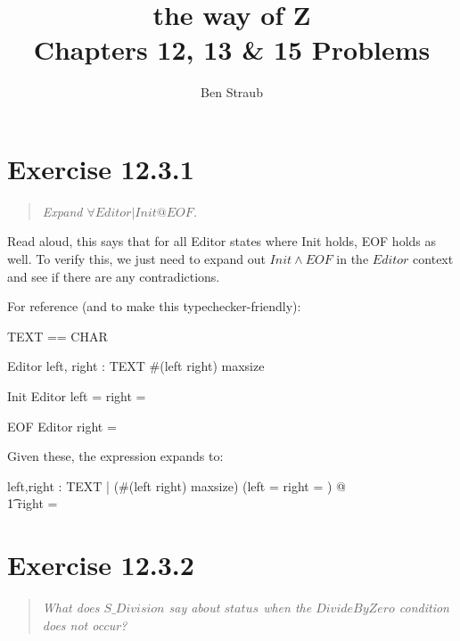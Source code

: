 \documentclass[10pt]{article}
\begin{document}
\title{the way of Z \\ Chapters 12, 13 \& 15 Problems}
\author{Ben Straub}
\maketitle

\section{Exercise 12.3.1}
\begin{quote}
  {\it
    Expand $\forall Editor | Init @ EOF$.
  }
\end{quote}
Read aloud, this says that for all Editor states where Init holds, EOF holds as well. To verify
this, we just need to expand out $Init \land EOF$ in the $Editor$ context and see if there are any
contradictions.

For reference (and to make this typechecker-friendly):
\begin{spec}
  \begin{zed}
    [CHAR] \also
    TEXT == \seq CHAR
  \end{zed}
  \begin{schema}{Editor}
    left, right : TEXT \where \#(left \cat right) \leq maxsize
  \end{schema}
  \begin{schema}{Init}
    Editor \where left = right = \langle \rangle
  \end{schema}
  \begin{schema}{EOF}
    Editor \where right = \langle \rangle
  \end{schema}

  Given these, the expression expands to:

  \begin{zed}
    \forall left,right : TEXT | (\#(left \cat right) \leq maxsize) \land (left = right = \langle \rangle) @ \\
    \t1 right = \langle \rangle
  \end{zed}
\end{spec}
\tocheck



\section{Exercise 12.3.2}
\begin{quote}
  {\it
    What does $S\_Division$ say about $status$ when the $DivideByZero$ condition does not occur?
  }
\end{quote}
\end{document}
